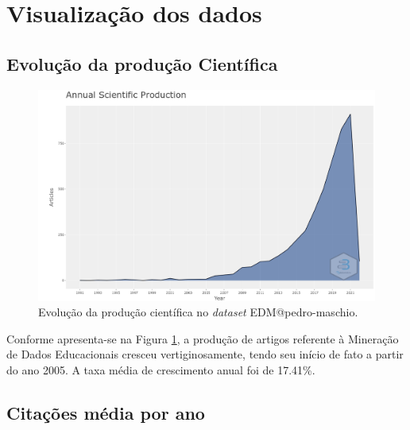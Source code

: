 \section{Visualização dos dados}

\subsection{Evolução da produção Científica}

\begin{figure}[H]
    \centering
    \includegraphics[width=1\textwidth]{experiments/pedro-maschio/PesquisaBibliogr/MineracaoDadosEducacionais/images/crescimento-anual.png}
    \caption{Evolução da produção científica no \textit{dataset} EDM@pedro-maschio.}
    \label{fig:evol:anual:EDM@pedro-maschio}
\end{figure}

Conforme apresenta-se na Figura \ref{fig:evol:anual:EDM@pedro-maschio}, a produção de artigos referente à Mineração de Dados Educacionais cresceu vertiginosamente, tendo seu início de fato a partir do ano 2005. A taxa média de crescimento anual foi de 17.41\%. 

\subsection{Citações média por ano}


